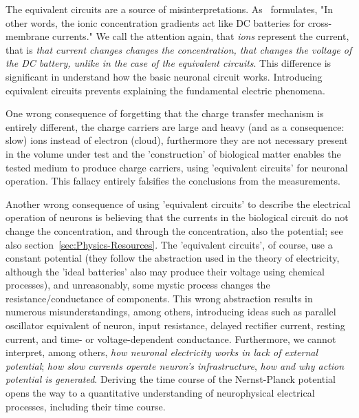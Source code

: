 The equivalent circuits are a source of misinterpretations. As~\cite{JohnstonWuNeurophysiology:1995} formulates,
"In other words, the ionic concentration gradients act like DC batteries for cross-membrane currents."
We call the attention again, that \textit{ions} represent the current,
that is \textit{that current changes changes the concentration, that changes
the voltage of the DC battery, unlike in the case of the equivalent circuits}.
This difference is significant in understand how the basic neuronal circuit works.
Introducing equivalent circuits prevents explaining the fundamental 
electric phenomena.


%
One wrong consequence of forgetting that the charge transfer mechanism is entirely different,
the charge carriers are large and heavy (and as a consequence: slow) ions instead of electron (cloud),
furthermore they are not necessary present in the 
volume under test and the 'construction' of biological matter 
enables the tested medium to produce charge carriers,
using 'equivalent circuits' for
neuronal operation. This fallacy
entirely falsifies the conclusions from the measurements.

Another wrong consequence of using 'equivalent circuits' to describe
the electrical operation of neurons is believing that the currents in
the biological circuit do not change the concentration, and through
the concentration, also the potential; see also section~\ref{sec:Physics-Resources}. The 'equivalent circuits',
of course, use a constant potential (they follow the abstraction used
in the theory of electricity, although the 'ideal batteries' also
may produce their voltage using chemical processes), and unreasonably, some mystic process changes the resistance/conductance of components. This wrong abstraction
results in numerous misunderstandings, among others, introducing ideas
such as parallel oscillator equivalent of neuron, input resistance,
delayed rectifier current, resting current, and time- or voltage-dependent
conductance. Furthermore, we cannot 
interpret, among others, \emph{how neuronal electricity
works in lack of external potential}; \emph{how slow currents operate
neuron's infrastructure}, \emph{how and why action potential is generated}.
Deriving the time course of the Nernst-Planck potential opens the
way to a quantitative understanding of neurophysical electrical processes,
including their time course.

